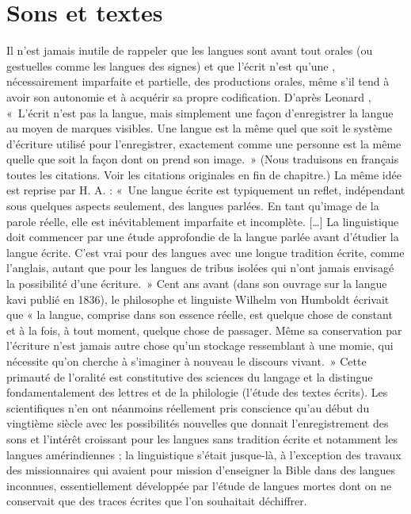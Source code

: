 \section{Sons et textes}\label{sec:1.1.2}

Il n’est jamais inutile de rappeler que les langues sont avant tout orales (ou gestuelles comme les langues des signes) et que l’écrit n’est qu’une , nécessairement imparfaite et partielle, des productions orales, même s’il tend à avoir son autonomie et à acquérir sa propre codification. D’après Leonard \citet{bloomfield1933language}, «~L’écrit n’est pas la langue, mais simplement une façon d’enregistrer la langue au moyen de marques visibles. Une langue est la même quel que soit le système d’écriture utilisé pour l’enregistrer, exactement comme une personne est la même quelle que soit la façon dont on prend son image.~» (Nous traduisons en français toutes les citations. Voir les citations originales en fin de chapitre.) La même idée est reprise par H. A. \citet{gleason1955introduction} : «~Une langue écrite est typiquement un reflet, indépendant sous quelques aspects seulement, des langues parlées. En tant qu’image de la parole réelle, elle est inévitablement imparfaite et incomplète. […] La linguistique doit commencer par une étude approfondie de la langue parlée avant d’étudier la langue écrite. C’est vrai pour des langues avec une longue tradition écrite, comme l’anglais, autant que pour les langues de tribus isolées qui n’ont jamais envisagé la possibilité d’une écriture.~» Cent ans avant (dans son ouvrage sur la langue kavi publié en 1836), le philosophe et linguiste Wilhelm von Humboldt écrivait que « la langue, comprise dans son essence réelle, est quelque chose de constant et à la fois, à tout moment, quelque chose de passager. Même sa conservation par l’écriture n’est jamais autre chose qu’un stockage ressemblant à une momie, qui nécessite qu’on cherche à s’imaginer à nouveau le discours vivant.~» Cette primauté de l’oralité est constitutive des sciences du langage et la distingue fondamentalement des lettres et de la philologie (l’étude des textes écrits). Les scientifiques n’en ont néanmoins réellement pris conscience qu’au début du vingtième siècle avec les possibilités nouvelles que donnait l’enregistrement des sons et l’intérêt croissant pour les langues sans tradition écrite et notamment les langues amérindiennes ; la linguistique s’était jusque-là, à l’exception des travaux des missionnaires qui avaient pour mission d’enseigner la Bible dans des langues inconnues, essentiellement développée par l’étude de langues mortes dont on ne conservait que des traces écrites que l’on souhaitait déchiffrer.

